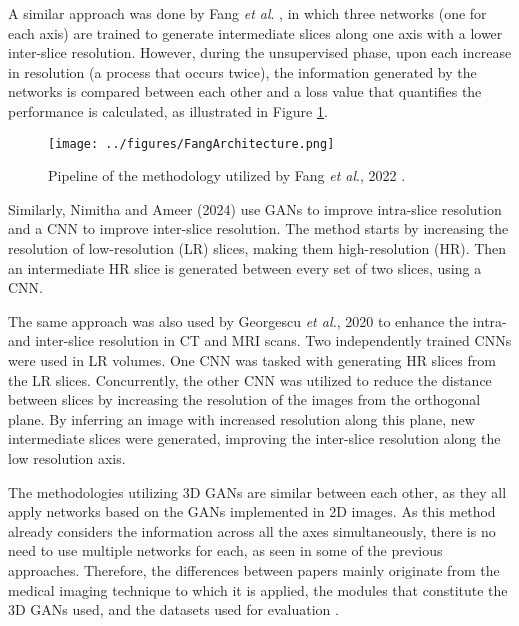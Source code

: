 \par
A similar approach was done by Fang \textit{et al}. \cite{Fang2022}, in which three networks (one for each axis) are trained to generate intermediate slices along one axis with a lower inter-slice resolution. However, during the unsupervised phase, upon each increase in resolution (a process that occurs twice), the information generated by the networks is compared between each other and a loss value that quantifies the performance is calculated, as illustrated in Figure \ref{fig:FangArchitecture}.
\begin{figure}[!ht]
	\hspace*{-0.7in}
	\texttt{[image: ../figures/FangArchitecture.png]}
	\caption{Pipeline of the methodology utilized by Fang \textit{et al}., 2022 \cite{Fang2022}.}
	\label{fig:FangArchitecture}
\end{figure}
\par
Similarly, Nimitha and Ameer (2024) \cite{Nimitha2024} use GANs to improve intra-slice resolution and a CNN to improve inter-slice resolution. The method starts by increasing the resolution of low-resolution (LR) slices, making them high-resolution (HR). Then an intermediate HR slice is generated between every set of two slices, using a CNN.
\par
The same approach was also used by Georgescu \textit{et al.}, 2020 \cite{Georgescu2020} to enhance the intra- and inter-slice resolution in CT and MRI scans. Two independently trained CNNs were used in LR volumes. One CNN was tasked with generating HR slices from the LR slices. Concurrently, the other CNN was utilized to reduce the distance between slices by increasing the resolution of the images from the orthogonal plane. By inferring an image with increased resolution along this plane, new intermediate slices were generated, improving the inter-slice resolution along the low resolution axis.
\par
The methodologies utilizing 3D GANs are similar between each other, as they all apply networks based on the GANs implemented in 2D images. As this method already considers the information across all the axes simultaneously, there is no need to use multiple networks for each, as seen in some of the previous approaches. Therefore, the differences between papers mainly originate from the medical imaging technique to which it is applied, the modules that constitute the 3D GANs used, and the datasets used for evaluation \cite{YChen2018, Sanchez2018, Kudo2019, Zhang2022}.
